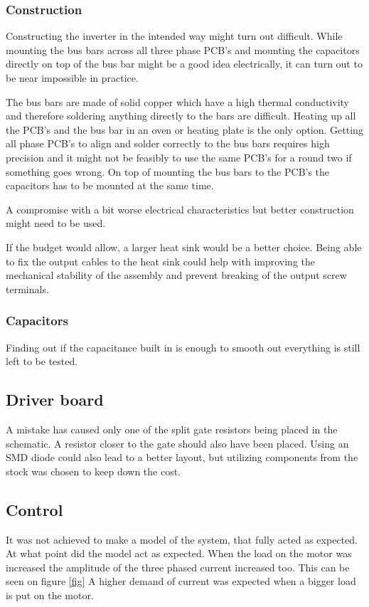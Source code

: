 \subsubsection{Construction}
Constructing the inverter in the intended way might turn out difficult. While mounting the bus bars across all three phase PCB's and mounting the capacitors directly on top of the bus bar might be a good idea electrically, it can turn out to be near impossible in practice.

The bus bars are made of solid copper which have a high thermal conductivity and therefore soldering anything directly to the bars are difficult. Heating up all the PCB's and the bus bar in an oven or heating plate is the only option. 
Getting all phase PCB's to align and solder correctly to the bus bars requires high precision and it might not be feasibly to use the same PCB's for a round two if something goes wrong.
On top of mounting the bus bars to the PCB's the capacitors has to be mounted at the same time. 

A compromise with a bit worse electrical characteristics but better construction might need to be used.

If the budget would allow, a larger heat sink would be a better choice. Being able to fix the output cables to the heat sink could help with improving the mechanical stability of the assembly and prevent breaking of the output screw terminals.

\subsubsection{Capacitors}
Finding out if the capacitance built in is enough to smooth out everything is still left to be tested.

\subsection{Driver board}
A mistake has caused only one of the split gate resistors being placed in the schematic. A resistor closer to the gate should also have been placed. Using an SMD diode could also lead to a better layout, but utilizing components from the stock was chosen to keep down the cost.

\subsection{Control}
It was not achieved to make a model of the system, that fully acted as expected. 
At what point did the model act as expected. When the load on the motor was increased the amplitude of the three phased current increased too. This can be seen on figure \ref{fig}  A higher demand of current was expected when a bigger load is put on the motor.



